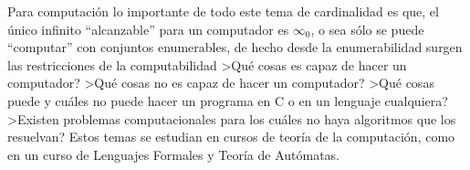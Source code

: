Para computación lo importante de todo este tema de cardinalidad es que, el único infinito ``alcanzable'' para un computador es $\infty_0$, o sea sólo se puede ``computar'' con conjuntos enumerables, de hecho desde la enumerabilidad surgen las restricciones de la computabilidad
>Qué cosas es capaz de hacer un computador? 
>Qué cosas no es capaz de hacer un computador?
>Qué cosas puede y cuáles no puede hacer un programa en C o en un lenguaje cualquiera?
>Existen problemas computacionales para los cuáles no haya algoritmos que los resuelvan?
Estos temas se estudian en cursos de teoría de la computación, como en un curso de Lenguajes Formales y Teoría de Autómatas.

